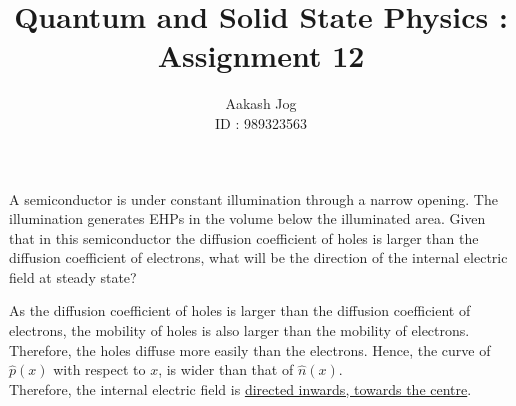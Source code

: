 \documentclass[fleqn, a4paper, 11pt, oneside]{amsart}
\title{Quantum and Solid State Physics : Assignment 12}
\author
{
	Aakash Jog\\
	ID : 989323563
}
\date{\formatdate{14}{1}{2016}}
\theoremstyle{definition}
\theoremstyle{theorem}
\renewcommand{\emph}{\uline}
\begin{document}

\maketitle

\begin{question}
	A semiconductor is under constant illumination through a narrow opening.
	The illumination generates EHPs in the volume below the illuminated area.
	Given that in this semiconductor the diffusion coefficient of holes is larger than the diffusion coefficient of electrons, what will be the direction of the internal electric field at steady state?
\end{question}

\begin{solution}
	As the diffusion coefficient of holes is larger than the diffusion coefficient of electrons, the mobility of holes is also larger than the mobility of electrons.
	Therefore, the holes diffuse more easily than the electrons.
	Hence, the curve of $\hat{p}(x)$ with respect to $x$, is wider than that of $\hat{n}(x)$.\\
	Therefore, the internal electric field is \emph{directed inwards, towards the centre}.
\end{solution}
\end{document}
